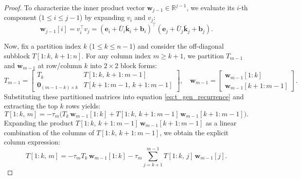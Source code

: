 \documentclass[a4paper,fleqn]{cas-sc}
\begin{document}
\begin{proof}
To characterize the inner product vector $\mathbf{w}_{j-1} \in \mathbb{R}^{j-1}$, we evaluate its $i$-th component ($1 \le i \le j-1$) by expanding $v_i$ and $v_j$:
\[
\mathbf{w}_{j-1}[i] = v_i^\top v_j = (\mathbf{e}_i + \bar{U}_i \bar{\mathbf{k}}_i + \mathbf{b}_i)^\top (\mathbf{e}_j + \bar{U}_j \bar{\mathbf{k}}_j + \mathbf{b}_j).
\]

Now, fix a partition index $k$ ($1 \le k \le n-1$) and consider the off-diagonal subblock $T[1:k, \, k+1:n]$. For any column index $m \ge k+1$, we partition $T_{m-1}$ and $\mathbf{w}_{m-1}$ at row/column $k$ into $2 \times 2$ block forms:
\[
T_{m-1} = \begin{bmatrix} T_k & T[1:k, \, k+1:m-1] \\ \mathbf{0}_{(m-1-k) \times k} & T[k+1:m-1, \, k+1:m-1] \end{bmatrix}, \quad
\mathbf{w}_{m-1} = \begin{bmatrix} \mathbf{w}_{m-1}[1:k] \\ \mathbf{w}_{m-1}[k+1:m-1] \end{bmatrix}.
\]
Substituting these partitioned matrices into equation \eqref{eq:t_gen_recurrence} and extracting the top $k$ rows yields:
\[
T[1:k, \, m] = -\tau_m \Big( T_k \, \mathbf{w}_{m-1}[1:k] + T[1:k, \, k+1:m-1] \, \mathbf{w}_{m-1}[k+1:m-1] \Big).
\]
Expanding the product $T[1:k, \, k+1:m-1] \, \mathbf{w}_{m-1}[k+1:m-1]$ as a linear combination of the columns of $T[1:k, \, k+1:m-1]$, we obtain the explicit column expression:
\begin{equation} \label{eq:subblock_col}
T[1:k, \, m] = -\tau_m T_k \, \mathbf{w}_{m-1}[1:k] - \tau_m \sum_{j=k+1}^{m-1} T[1:k, \, j] \, \mathbf{w}_{m-1}[j].
\end{equation}


\end{proof}
\end{document}
